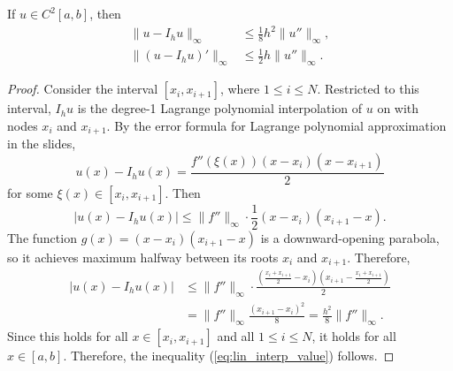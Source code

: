 \documentclass{homework}
\begin{document}
	\question
	If $u \in C^2[a,b]$, then
	\begin{align}
		\label{eq:lin_interp_value}
		\lVert u - I_hu\rVert_\infty &\le \frac{1}{8}h^2\lVert u'' \rVert_\infty,\\
		\label{eq:lin_interp_deriv}
		\lVert (u - I_hu)'\rVert_\infty &\le \frac{1}{2}h\lVert u''\rVert_\infty.
	\end{align}
	\begin{proof}
		Consider the interval $[x_i, x_{i+1}]$, where $1 \le i \le N$. Restricted to this interval, $I_hu$ is the degree-1 Lagrange polynomial interpolation of $u$ on with nodes $x_i$ and $x_{i+1}$. By the error formula for Lagrange polynomial approximation in the slides,
		\begin{equation}
			u(x) - I_hu(x) = \frac{f''(\xi(x))(x-x_i)(x-x_{i+1})}{2}
		\end{equation}
		for some $\xi(x) \in [x_i,x_{i+1}]$. Then
		\begin{equation}
			|u(x) - I_hu(x)| \le \lVert f''\rVert_\infty \cdot \frac{1}{2}(x-x_i)(x_{i+1}-x).
		\end{equation}
		The function $g(x) = (x-x_i)(x_{i+1} -x)$ is a downward-opening parabola, so it achieves maximum halfway between its roots $x_i$ and $x_{i+1}$. Therefore,
		\begin{align}
			|u(x) - I_hu(x)| &\le \lVert f'' \rVert_\infty \cdot\frac{\left(\frac{x_i + x_{i+1}}{2} - x_i\right)\left(x_{i+1}-\frac{x_i + x_{i+1}}{2}\right)}{2} \\
			&=  \lVert f''\rVert_\infty \frac{(x_{i+1} - x_i)^2}{8} = \frac{h^2}{8}\lVert f''\rVert_\infty.
		\end{align}
		Since this holds for all $x \in [x_i, x_{i+1}]$ and all $1\le i \le N$, it holds for all $x \in [a,b]$. Therefore, the inequality (\ref{eq:lin_interp_value}) follows.
		

\end{proof}
\end{document}
